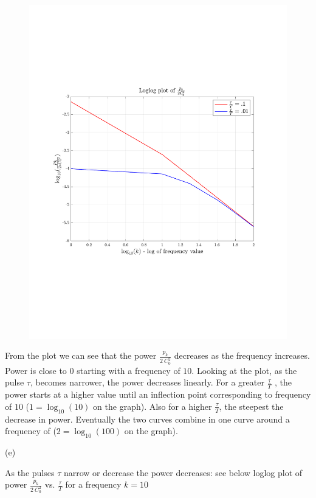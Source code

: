 \documentclass[12pt,twoside]{article}
\begin{document}
\begin{figure}[!h]
 \centering
 \includegraphics[scale=0.5]{power_vs_tau_T}
\end{figure}
From the plot we can see that the power $\frac{p_k}{2 ~ C_0^2}$ decreases as the frequency increases.
Power is close to $0$ starting with a frequency of $10$.
Looking at the plot, as the pulse $\tau$, becomes narrower, the power decreases linearly.
For a greater  $\frac{\tau}{T}$ , the power starts at a higher value  until an inflection point corresponding to frequency of $10$ ($1 = \log_{10}(10)$ on the graph).
Also for a higher $\frac{\tau}{T}$, the steepest the decrease in power. Eventually the two curves combine in one curve around
a frequency of ($2 = \log_{10}(100)$ on the graph).

\item [(e)]

As the pulses $\tau$ narrow or decrease the power decreases: see below loglog plot  of power  $\frac{p_k}{2 ~ C_0^2}$ vs.  $\frac{\tau}{T}$ for a frequency $k=10$
\end{document}
